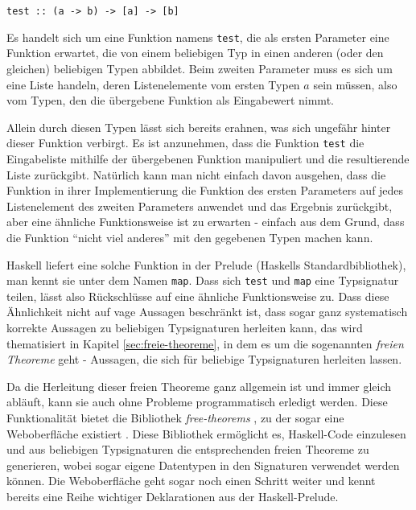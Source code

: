 \begin{verbatim}
test :: (a -> b) -> [a] -> [b]
\end{verbatim}

Es handelt sich um eine Funktion namens \texttt{test}, die als ersten Parameter eine Funktion erwartet, die von einem beliebigen
Typ in einen anderen (oder den gleichen) beliebigen Typen abbildet. Beim zweiten Parameter muss es sich um eine Liste handeln,
deren Listenelemente vom ersten Typen $a$ sein müssen, also vom Typen, den die übergebene Funktion als Eingabewert nimmt.

Allein durch diesen Typen lässt sich bereits erahnen, was sich ungefähr hinter dieser Funktion verbirgt. Es ist anzunehmen, dass die
 Funktion \texttt{test} die Eingabeliste mithilfe der übergebenen Funktion manipuliert und die resultierende Liste zurückgibt.
 Natürlich kann man nicht einfach davon ausgehen, dass die Funktion in ihrer Implementierung die Funktion des ersten Parameters
 auf jedes Listenelement des zweiten Parameters anwendet und das Ergebnis zurückgibt, aber eine ähnliche Funktionsweise
 ist zu erwarten - einfach aus dem Grund, dass die Funktion ``nicht viel anderes'' mit den gegebenen Typen machen kann.

Haskell liefert eine solche Funktion in der Prelude (Haskells Standardbibliothek), man kennt sie unter dem Namen \texttt{map}.
Dass sich \texttt{test} und
\texttt{map} eine Typsignatur teilen, lässt also Rückschlüsse auf eine ähnliche Funktionsweise zu. Dass diese Ähnlichkeit
nicht auf vage Aussagen beschränkt ist, dass sogar ganz systematisch korrekte Aussagen zu beliebigen Typsignaturen
herleiten kann, das wird thematisiert in Kapitel \ref{sec:freie-theoreme}, in dem es um die sogenannten \textit{freien Theoreme}
geht - Aussagen, die sich für beliebige Typsignaturen herleiten lassen.

Da die Herleitung dieser freien Theoreme ganz allgemein ist und immer gleich abläuft, kann sie auch ohne Probleme
programmatisch erledigt werden. Diese Funktionalität bietet die Bibliothek \textit{free-theorems} \cite{freetheorems}, zu
der sogar eine Weboberfläche existiert \cite{freetheoremswebui}.
Diese Bibliothek ermöglicht es, Haskell-Code einzulesen und aus beliebigen Typsignaturen die entsprechenden freien
Theoreme zu generieren, wobei sogar eigene Datentypen in den Signaturen verwendet werden können. Die Weboberfläche geht
sogar noch einen Schritt weiter und kennt bereits eine Reihe wichtiger Deklarationen aus der Haskell-Prelude.


